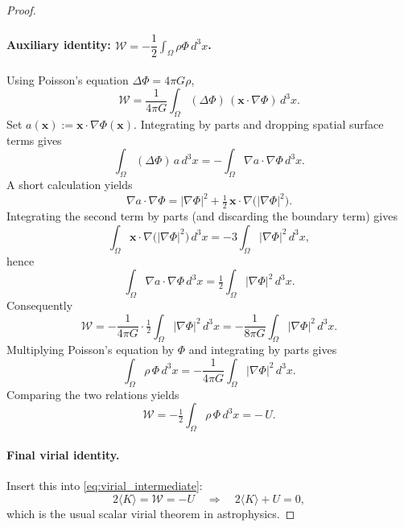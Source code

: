 \documentclass[12pt,a4paper]{article}
\numberwithin{equation}{section}
\begin{document}
\begin{proof}
\paragraph{Auxiliary identity: \(\mathcal{W} = -\dfrac{1}{2}\!\displaystyle\int_{\Omega}\rho\Phi\,d^3x\).}
Using Poisson's equation \(\Delta\Phi=4\pi G\rho\),
\begin{equation}
\mathcal{W} = \frac{1}{4\pi G}\int_{\Omega} (\Delta\Phi)\,(\mathbf{x}\!\cdot\!\nabla\Phi)\,d^3x.
\end{equation}
Set $a(\mathbf{x}):=\mathbf{x}\!\cdot\!\nabla\Phi(\mathbf{x})$. Integrating by parts and dropping spatial surface terms gives
\begin{equation}
\int_{\Omega} (\Delta\Phi)\,a\,d^3x = -\int_{\Omega} \nabla a\!\cdot\!\nabla\Phi\,d^3x.
\end{equation}
A short calculation yields
\begin{equation}
\nabla a\!\cdot\!\nabla\Phi = |\nabla\Phi|^2 + \tfrac12\,\mathbf{x}\!\cdot\!\nabla\big(|\nabla\Phi|^2\big).
\end{equation}
Integrating the second term by parts (and discarding the boundary term) gives
\begin{equation}
\int_{\Omega} \mathbf{x}\!\cdot\!\nabla\big(|\nabla\Phi|^2\big)\,d^3x = -3\int_{\Omega} |\nabla\Phi|^2\,d^3x,
\end{equation}
hence
\begin{equation}
\int_{\Omega} \nabla a\!\cdot\!\nabla\Phi\,d^3x = \tfrac12\int_{\Omega} |\nabla\Phi|^2\,d^3x.
\end{equation}
Consequently
\begin{equation}
\mathcal{W} = -\frac{1}{4\pi G}\cdot \tfrac12\int_{\Omega} |\nabla\Phi|^2\,d^3x
= -\frac{1}{8\pi G}\int_{\Omega} |\nabla\Phi|^2\,d^3x.
\end{equation}
Multiplying Poisson's equation by \(\Phi\) and integrating by parts gives
\begin{equation}
\int_{\Omega} \rho\,\Phi\,d^3x = -\frac{1}{4\pi G}\int_{\Omega} |\nabla\Phi|^2\,d^3x.
\end{equation}
Comparing the two relations yields
\begin{equation}
\mathcal{W} = -\tfrac12 \int_{\Omega} \rho\,\Phi\,d^3x = -\,U.
\end{equation}

\paragraph{Final virial identity.}
Insert this into \eqref{eq:virial_intermediate}:
\begin{equation}
2\langle {K}\rangle = \mathcal{W} = -U \quad\Longrightarrow\quad 2\langle {K}\rangle + U = 0,
\end{equation}
which is the usual scalar virial theorem in astrophysics.
\end{proof}
\end{document}
